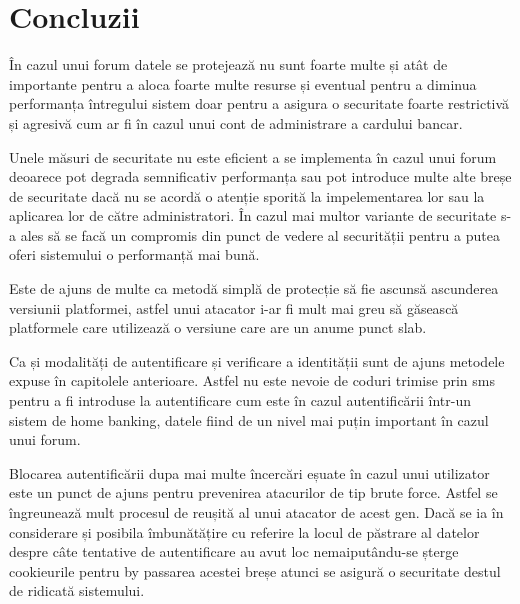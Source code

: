 \chapter{Concluzii}

În cazul unui forum datele se protejează nu sunt foarte multe și atât de importante pentru a aloca foarte multe resurse și eventual pentru a diminua performanța întregului sistem doar pentru a asigura o securitate foarte restrictivă și agresivă cum ar fi în cazul unui cont de administrare a cardului bancar.

Unele măsuri de securitate nu este eficient a se implementa în cazul unui forum deoarece pot degrada semnificativ performanța sau pot introduce multe alte breșe de securitate dacă nu se acordă o atenție sporită la impelementarea lor sau la aplicarea lor de către administratori. În cazul mai multor variante de securitate s-a ales să se facă un compromis din punct de vedere al securității pentru a putea oferi sistemului o performanță mai bună.

Este de ajuns de multe ca metodă simplă de protecție să fie ascunsă ascunderea versiunii platformei, astfel unui atacator i-ar fi mult mai greu să găsească platformele care utilizează o versiune care are un anume punct slab.

Ca și modalități de autentificare și verificare a identității sunt de ajuns metodele expuse în capitolele anterioare. Astfel nu este nevoie de coduri trimise prin sms pentru a fi introduse la autentificare cum este în cazul autentificării într-un sistem de home banking, datele fiind de un nivel mai puțin important în cazul unui forum. 

Blocarea autentificării dupa mai multe încercări eșuate în cazul unui utilizator este un punct de ajuns pentru prevenirea atacurilor de tip brute force. Astfel se îngreunează mult procesul de reușită al unui atacator de acest gen. Dacă se ia în considerare și posibila îmbunătățire cu referire la locul de păstrare al datelor despre câte tentative de autentificare au avut loc nemaiputându-se șterge cookieurile pentru by passarea acestei breșe atunci se asigură o securitate destul de ridicată sistemului.